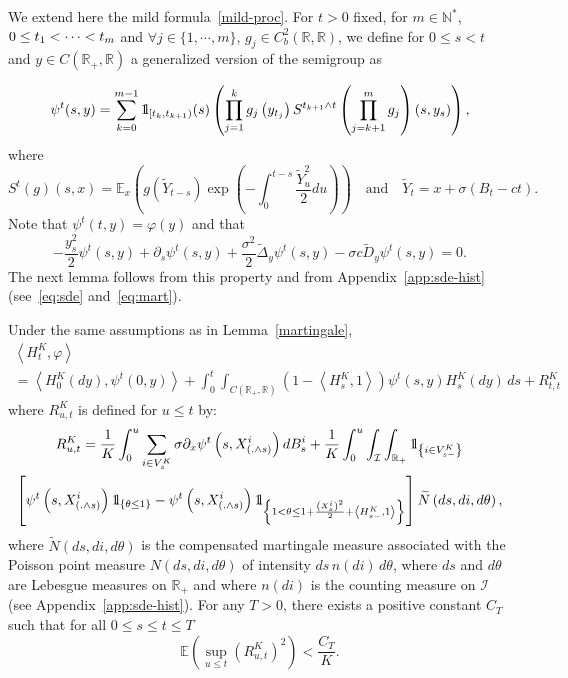 \documentclass[AHL,Unicode,longabstracts,published]{cedram}
\newcommand{\Io}{\mathcal{I}}
\newcommand*\N{\mathbb{N}}
\newcommand*\R{\mathbb{R}}
\newcommand*\E{\mathbb{E}}
\newcommand*\ind{{\mathchoice {\rm 1\mskip-4mu l} {\rm 1\mskip-4mu l} {\rm 1\mskip-4.5mu l} {\rm 1\mskip-5mu l}}}
\let\oldtilde\tilde
\renewcommand*{\tilde}[1]{\mathchoice{\widetilde{#1}}{\widetilde{#1}}{\oldtilde{#1}}{\oldtilde{#1}}}
\let\oldforall\forall
\renewcommand*{\forall}{\mathrel{\oldforall}}
\begin{document}
We extend here the mild formula~\eqref{mild-proc}. For $t>0$ fixed, for $m\in \N^*$, $0\le t_{1}<\cdots\linebreak<t_{m}$ and $\forall j \in \{1,\cdots,m\}$, $g_{j}\in C_{b}^2(\R, \R)$, we define for $0\le s< t$ and $y\in C(\R_+,\R)$ a generalized version of the semigroup as

\begin{equation}
\psi^t(s,y) = \sum_{k=0}^{m-1}\ind_{\left[t_k, t_{k+1}\right)}(s)\left(\prod_{j=1}^k g_j\left(y_{t_j}\right) S^{t_{k+1} \wedge t}\left(\prod_{j=k+1}^m g_j\right)(s,y_s)\right),
\end{equation}
where
\[
S^t(g)(s,x)= \E_{x}\left(g\left(\widetilde{Y}_{t-s}\right)\exp\left(-\int_{0}^{t-s} \frac{\widetilde{Y}_{u}^2}{2}du\right)\right)\quad\text{and}\quad\widetilde{Y}_{t}= x+\sigma\left(B_{t}-ct\right).
\]
Note that $\psi^t(t,y)=\varphi(y)$ and that
\[
-\frac{y_{s}^2}{2} \psi^t(s,y)+ \partial_s \psi^t(s,y)+ \frac{\sigma^2}{2} \widetilde{\Delta}_y\psi^t(s,y)-\sigma c \widetilde{D}_y\psi^t(s,y)=0.
\]
The next lemma follows from this property and from Appendix~\ref{app:sde-hist} (see~\eqref{eq:sde} and~\eqref{eq:mart}).

\begin{lemm}
Under the same assumptions as in Lemma~\ref{martingale},
\begin{multline}\label{martingale:mild}
\left\langle H^K_t,\varphi\right\rangle\\
= \left\langle H^K_0(dy),\psi^t(0,y)\right\rangle + \int_0^t \int_{C\left(\R_+, \R\right)} \left(1 - \left\langle H^K_s,1\right\rangle\right)\psi^t(s,y) H^K_s(dy)\, ds+ R_{t, t}^{K}
\end{multline}
where $R^K_{u, t}$ is defined for $u\leq t$ by:
\begin{multline}\label{def:Rut}
R^K_{u, t}
= \frac{1}{K} \int_0^u \sum_{i \in V^K_{s}} \sigma \partial_x \psi^t\left(s,X^i_{\left(.\wedge s\right)}\right) dB^i_s
+ \frac{1}{K}\int_0^u \int_{\Io}\int_{\R_+}\ind_{\left\{i \in V^K_{s-}\right\}}\\
\left[\psi^t\left(s,X^i_{\left(.\wedge s\right)}\right)\ind_{\left\{\theta \leq 1\right\}} 
 -\psi^t\left(s,X^i_{\left(.\wedge s\right)}\right) \ind_{\left\{1 < \theta \leq 1+ \frac{\left(X^i_{s}\right)^2}{2}+\left\langle H_{s-}^{K}, 1\right\rangle\right\}} \right] \tilde N\left(ds, di, d\theta\right),
\end{multline}
where $\widetilde{N}(ds,di,d\theta)$ is the compensated martingale measure associated with the Poisson point measure $N(ds,di,d\theta)$ of intensity  $ds\, n(di)\, d\theta$, where $ds$ and $d\theta$ are Lebesgue measures on $\mathbb{R}_+$ and where $n(di)$ is the counting measure on $\mathcal{I}$ (see Appendix~\ref{app:sde-hist}). For any $T>0$, there exists a positive constant $C_{T}$ such that for all $0\leq s\leq t\leq T$
\begin{equation}\label{estimee:R}
\E\left(\sup_{u \le t}\left(R^K_{u, t}\right)^2\right) < \frac{C_{T}}{K}.
\end{equation}
\end{lemm}
\end{document}
